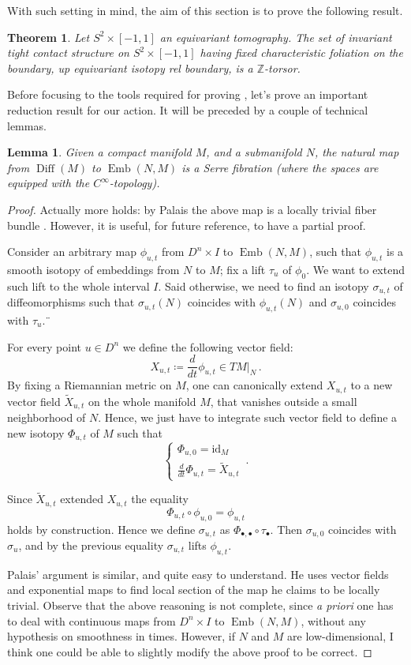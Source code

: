 \documentclass[a4paper, 11pt]{amsart}
\theoremstyle{plain}
\newtheorem{lemma}[lemma]{Lemma}
\newtheorem{thm}{Theorem}
\theoremstyle{definition}
\newcommand{\id}{\text{id}}
\newcommand{\Z}{\mathbb{Z}}
\DeclareMathOperator{\Emb}{Emb}
\DeclareMathOperator{\Diff}{Diff}
\begin{document}
With such setting in mind, the aim of this section is to prove the following result.
\begin{thm}\label{thm:mainthmtomographyStwo}
	Let $S^2 \times [-1,1]$ an equivariant tomography. The set of invariant tight contact structure on $S^2 \times [-1,1]$ having fixed characteristic foliation on the boundary, up equivariant isotopy rel boundary, is a $\Z$-torsor.
\end{thm}

Before focusing to the tools required for proving , let's prove an important reduction result for our action. It will be preceded by a couple of technical lemmas.
\begin{lemma}\label{Palais}
	Given a compact manifold $M$, and a submanifold $N$, the natural map from $\Diff(M)$ to $\Emb(N,M)$ is a Serre fibration (where the spaces are equipped with the $C^\infty$-topology).
\end{lemma}
\begin{proof}
	Actually more holds: by Palais the above map is a locally trivial fiber bundle \cite{PalaisLocaltrivialityoftherestrictionmap}. However, it is useful, for future reference, to have a partial proof.
	
	Consider an arbitrary map $\phi_{u,t}$ from $D^n \times I$ to $\Emb(N,M)$, such that $\phi_{u,t}$ is a smooth isotopy of embeddings from $N$ to $M$; fix a lift $\tau_u$ of $\phi_0$. We want to extend such lift to the whole interval $I$. Said otherwise, we need to find an isotopy $\sigma_{u,t}$ of diffeomorphisms such that $\sigma_{u,t}(N)$ coincides with $\phi_{u,t}(N)$ and $\sigma_{u,0}$ coincides with $\tau_u$.¨
	
	For every point $u \in D^n$  we define the following vector field:
	\[
		X_{u,t} \coloneqq \frac{d}{dt} \phi_{u,t} \in TM|_N\,.
	\]
	By fixing a Riemannian metric on $M$, one can canonically extend $X_{u,t}$ to a new vector field $\tilde{X}_{u,t}$ on the whole manifold $M$, that vanishes outside a small neighborhood of $N$. Hence, we just have to integrate such vector field to define a new isotopy $\Phi_{u,t}$ of $M$ such that
	\[
	\begin{cases}
		\Phi_{u,0} = \id_M \\
		\frac{d}{dt} \Phi_{u,t} = \tilde{X}_{u,t}
	\end{cases}\,.
	\]
	
	Since $\tilde{X}_{u,t}$ extended $X_{u,t}$ the equality
	\[
		\Phi_{u,t} \circ \phi_{u,0} = \phi_{u,t}
	\]
	holds by construction. Hence we define $\sigma_{u,t}$ as $\Phi_{\bullet,\bullet} \circ \tau_{\bullet}$. Then $\sigma_{u,0}$ coincides with $\sigma_u$, and by the previous equality $\sigma_{u,t}$ lifts $\phi_{u,t}$.
	
	Palais' argument is similar, and quite easy to understand. He uses vector fields and exponential maps to find local section of the map he claims to be locally trivial. Observe that the above reasoning is not complete, since \emph{a priori} one has to deal with continuous maps from $D^n \times I$ to $\Emb(N,M)$, without any hypothesis on smoothness in times. However, if $N$ and $M$ are low-dimensional, I think one could be able to slightly modify the above proof to be correct.
\end{proof}
\end{document}
